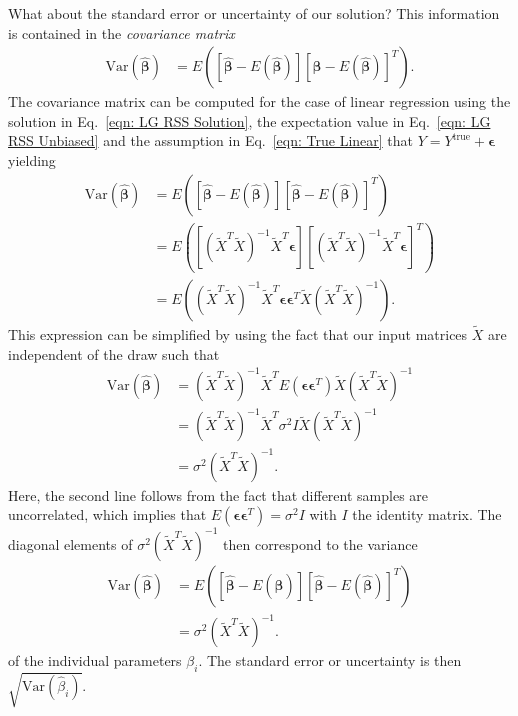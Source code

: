 What about the standard error or uncertainty of our solution? This information is contained in the \emph{covariance matrix}
\begin{equation}
\begin{split}
    \textrm{Var}(\hat{\bm{\beta}}) &= E\left([\hat{\bm{\beta}} - E(\hat{\bm{\beta}})][\hat{\bm{\beta}} - E(\hat{\bm{\beta}})]^{T} \right).
\end{split}
\end{equation}
The covariance matrix can be computed for the case of linear regression using the solution in Eq.~\eqref{eqn: LG RSS Solution}, the expectation value in Eq.~\eqref{eqn: LG RSS Unbiased} and the assumption in Eq.~\eqref{eqn: True Linear} that $Y = Y^{\textrm{true}} + \bm{\epsilon}$ yielding
\begin{equation}
\begin{split}
    \textrm{Var}(\hat{\bm{\beta}}) &= E\left([\hat{\bm{\beta}} - E(\hat{\bm{\beta}})][\hat{\bm{\beta}} - E(\hat{\bm{\beta}})]^{T} \right)\\
     &= E\left( \left[ (\widetilde{X}^{T}\widetilde{X})^{-1} \widetilde{X}^{T} \bm{\epsilon} \right] \left[ (\widetilde{X}^{T}\widetilde{X})^{-1} \widetilde{X}^{T} \bm{\epsilon}\right]^{T} \right) \\
    &= E\left( (\widetilde{X}^{T}\widetilde{X})^{-1} \widetilde{X}^{T} \bm{\epsilon} \bm{\epsilon}^{T} \widetilde{X} (\widetilde{X}^{T}\widetilde{X})^{-1}  \right).
\end{split}
\end{equation}
This expression can be simplified by using the fact that our input matrices $\widetilde{X}$ are independent of the draw such that
\begin{equation}
\begin{split}
\textrm{Var}(\hat{\bm{\beta}})
    &= (\widetilde{X}^{T}\widetilde{X})^{-1} \widetilde{X}^{T} E(\bm{\epsilon} \bm{\epsilon}^{T}) \widetilde{X} (\widetilde{X}^{T}\widetilde{X})^{-1} \\
    &= (\widetilde{X}^{T}\widetilde{X})^{-1} \widetilde{X}^{T} \sigma^2 I \widetilde{X} (\widetilde{X}^{T}\widetilde{X})^{-1} \\
    &= \sigma^2 (\widetilde{X}^{T}\widetilde{X})^{-1}.
\end{split}
\end{equation}
Here, the second line follows from the fact that different samples are uncorrelated, which implies that $E(\bm{\epsilon} \bm{\epsilon}^{T}) = \sigma^2 I$ with $I$ the identity matrix. The diagonal elements of $\sigma^2 (\widetilde{X}^{T}\widetilde{X})^{-1}$ then correspond to the variance
\begin{equation}
\begin{split}
    \textrm{Var}(\hat{\bm{\beta}}) &= E\left([\hat{\bm{\beta}} - E(\hat{\bm{\beta}})][\hat{\bm{\beta}} - E(\hat{\bm{\beta}})]^{T} \right)\\
     &= \sigma^2 (\widetilde{X}^{T}\widetilde{X})^{-1}.
\end{split}
\end{equation}
of the individual parameters $\beta_i$. The standard error or uncertainty is then $\sqrt{\textrm{Var}(\hat{\beta}_{i})}$.

